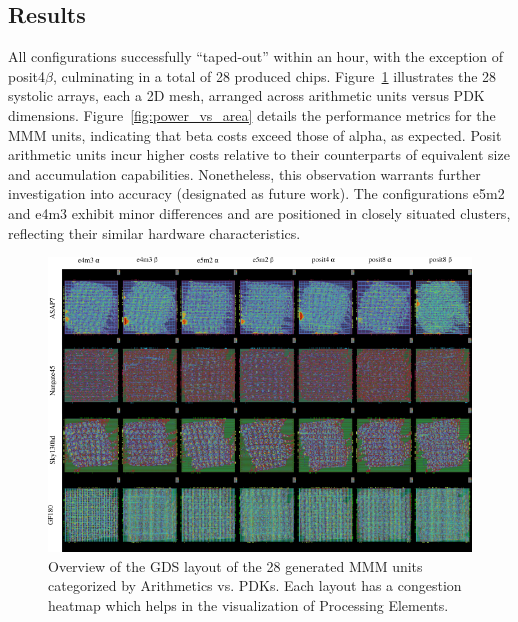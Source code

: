 
\subsection{Results}
All configurations successfully ``taped-out'' within an hour, with the exception of posit4$\beta$, culminating in a total of 28 produced chips.
Figure~\ref{fig:all_arrays} illustrates the 28 systolic arrays, each a 2D mesh, arranged across arithmetic units versus PDK dimensions.
Figure~\ref{fig:power_vs_area} details the performance metrics for the MMM units, indicating that beta costs exceed those of alpha, as expected.
Posit arithmetic units incur higher costs relative to their counterparts of equivalent size and accumulation capabilities.
Nonetheless, this observation warrants further investigation into accuracy (designated as future work).
The configurations e5m2 and e4m3 exhibit minor differences and are positioned in closely situated clusters, reflecting their similar hardware characteristics.

\begin{figure}[t]
\centering
	\vspace{-0.5cm}
	\includegraphics[width=0.9\columnwidth]{./figures/systolic_arrays2.png}
	\caption{Overview of the GDS layout of the 28 generated MMM units categorized by Arithmetics vs. PDKs. Each layout has a congestion heatmap which helps in the visualization of Processing Elements.}
	\vspace{-0.5cm}
	\label{fig:all_arrays}
\end{figure}

